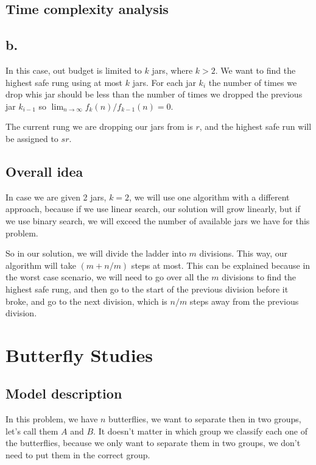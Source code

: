 \documentclass{article}
\begin{document}
\subsection*{Time complexity analysis}

\subsection*{b.}

In this case, out budget is limited to $k$ jars, where $k>2$. We want to find the highest safe rung using at most $k$ jars. For each jar $k_i$ the number of times we drop whis jar should be less than the number of times we dropped the previous jar $k_{i-1}$ so $\lim_{n\to\infty} f_k(n)/f_{k-1}(n) = 0$.

The current rung we are dropping our jars from is $r$, and the highest safe run will be assigned to $sr$.

\subsection*{Overall idea}

In case we are given 2 jars, $k = 2$, we will use one algorithm with a different approach, because if we use linear search, our solution will grow linearly, but if we use binary search, we will exceed the number of available jars we have for this problem.

So in our solution, we will divide the ladder into $m$ divisions. This way, our algorithm will take $(m+n/m)$ steps at most. This can be explained because in the worst case scenario, we will need to go over all the $m$ divisions to find the highest safe rung, and then go to the start of the previous division before it broke, and go to the next division, which is $n/m$ steps away from the previous division.


\section*{Butterfly Studies}

\subsection*{Model description}

In this problem, we have $n$ butterflies, we want to separate then in two groups, let's call them $A$ and $B$. It doesn't matter in which group we classify each one of the butterflies, because we only want to separate them in two groups, we don't need to put them in the correct group.
\end{document}
